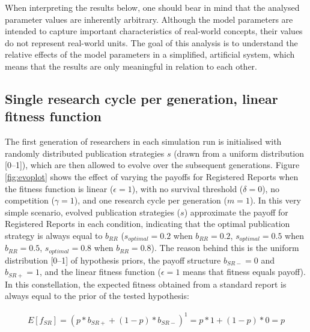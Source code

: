 \documentclass[
  ,man,mask,floatsintext]{apa6}
\begin{document}
When interpreting the results below, one should bear in mind that the analysed parameter values are inherently arbitrary.
Although the model parameters are intended to capture important characteristics of real-world concepts, their values do not represent real-world units.
The goal of this analysis is to understand the relative effects of the model parameters in a simplified, artificial system, which means that the results are only meaningful in relation to each other.

\hypertarget{single-research-cycle-per-generation-linear-fitness-function}{%
\subsection{Single research cycle per generation, linear fitness function}\label{single-research-cycle-per-generation-linear-fitness-function}}

The first generation of researchers in each simulation run is initialised with randomly distributed publication strategies \(s\) (drawn from a uniform distribution {[}0--1{]}), which are then allowed to evolve over the subsequent generations.
Figure \ref{fig:evoplot} shows the effect of varying the payoffs for Registered Reports when the fitness function is linear (\(\epsilon = 1\)), with no survival threshold (\(\delta = 0\)), no competition (\(\gamma = 1\)), and one research cycle per generation (\(m = 1\)).
In this very simple scenario, evolved publication strategies (\(s\)) approximate the payoff for Registered Reports in each condition, indicating that the optimal publication strategy is always equal to \(b_{RR}\) (\(s_{optimal} = 0.2\) when \(b_{RR} = 0.2\), \(s_{optimal} = 0.5\) when \(b_{RR} = 0.5\), \(s_{optimal} = 0.8\) when \(b_{RR} = 0.8\)).
The reason behind this is the uniform distribution {[}0--1{]} of hypothesis priors, the payoff structure \(b_{SR-} = 0\) and \(b_{SR+} = 1\), and the linear fitness function (\(\epsilon = 1\) means that fitness equals payoff).
In this constellation, the expected fitness obtained from a standard report is always equal to the prior of the tested hypothesis:

\begin{align}
E[f_{SR}] = (p * b_{SR+} + (1-p) * b_{SR-})^1 = p * 1 +  (1-p) * 0 = p
\end{align}
\end{document}
